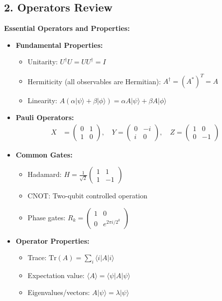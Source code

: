 \documentclass{article}
\begin{document}
\subsection{2. Operators Review}
\textbf{Essential Operators and Properties:}
\begin{itemize}
    \item \textbf{Fundamental Properties:}
        \begin{itemize}
            \item Unitarity: \(U^\dagger U = UU^\dagger = I\)
            \item Hermiticity (all observables are Hermitian): \(A^\dagger = (A^*)^T = A\)
            \item Linearity: \(A (\alpha \lvert \psi \rangle + \beta \lvert \phi \rangle) = \alpha A \lvert \psi \rangle + \beta A \lvert \phi \rangle\)
        \end{itemize}
        
    \item \textbf{Pauli Operators:}
        \begin{align*}
        X &= 
        \begin{pmatrix}
        0 & 1 \\
        1 & 0
        \end{pmatrix}, \quad
        Y = 
        \begin{pmatrix}
        0 & -i \\
        i & 0
        \end{pmatrix}, \quad
        Z = 
        \begin{pmatrix}
        1 & 0 \\
        0 & -1
        \end{pmatrix}
        \end{align*}
    \item \textbf{Common Gates:}
        \begin{itemize}
            \item Hadamard: \(H = \frac{1}{\sqrt{2}}
            \begin{pmatrix}
            1 & 1 \\
            1 & -1
            \end{pmatrix}\)
            \item CNOT: Two-qubit controlled operation
            \item Phase gates: \(R_k = \begin{pmatrix} 1 & 0 \\ 0 & e^{2\pi i/2^k} \end{pmatrix}\)
        \end{itemize}
    \item \textbf{Operator Properties:}
        \begin{itemize}
            \item Trace: \(\mathrm{Tr}(A) = \sum_i \langle i \lvert A \rvert i \rangle\)
            \item Expectation value: \(\langle A \rangle = \langle \psi \lvert A \rvert \psi \rangle\)
            \item Eigenvalues/vectors: \(A \lvert \psi \rangle = \lambda \lvert \psi \rangle\)
        \end{itemize}
\end{itemize}
\end{document}
